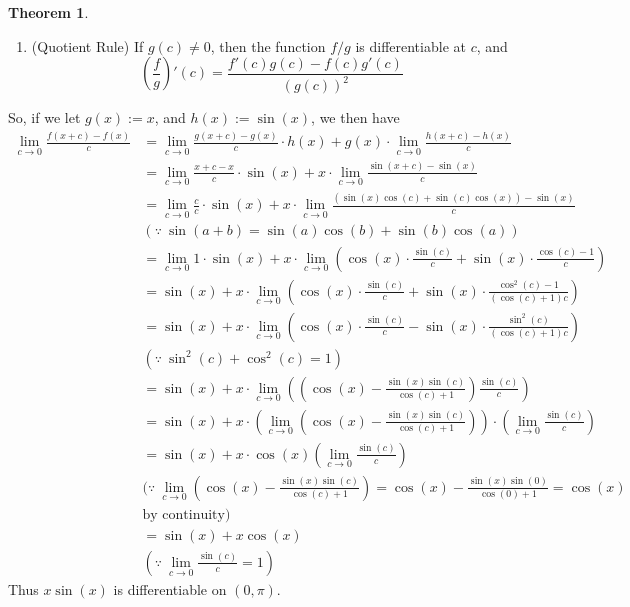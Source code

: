 \documentclass[12pt,letterpaper]{article}
\theoremstyle{case}
\theoremstyle{definition}
\newtheorem*{theorem*}{Theorem}
\begin{document}
\begin{enumerate}
\begin{enumerate}
\begin{theorem*}
\begin{enumerate}
					\item (Quotient Rule) If $g(c) \neq 0$, then the function $f/g$ is differentiable at $c$, and
					\[\left( \frac{f}{g}\right)'(c) = \frac{f'(c)g(c)-f(c)g'(c)}{(g(c))^2}\]
				\end{enumerate}
			\end{theorem*}
			So, if we let $g(x):=x$, and $h(x):=\sin (x)$, we then have
			\begin{align*}
				\lim\limits_{c \to 0} \frac{f(x+c)-f(x)}{c} &= \lim\limits_{c \to 0} \frac{g(x+c)-g(x)}{c} \cdot h(x) + g(x) \cdot \lim\limits_{c \to 0} \frac{h(x+c)-h(x)}{c} \\
				&= \lim\limits_{c \to 0} \frac{x+c-x}{c} \cdot \sin (x) + x \cdot \lim\limits_{c \to 0} \frac{\sin (x+c)-\sin (x)}{c} \\
				&= \lim\limits_{c \to 0} \frac{c}{c} \cdot \sin(x) + x \cdot \lim\limits_{c \to 0} \frac{(\sin (x)\cos (c) + \sin(c)\cos(x))-\sin(x)}{c} \\
				& (\because\ \sin(a+b)=\sin(a)\cos(b)+\sin(b)\cos(a)) \\
				&= \lim\limits_{c \to 0} 1 \cdot \sin(x) + x \cdot\lim\limits_{c \to 0} \left(\cos(x)\cdot\frac{\sin(c)}{c}+\sin(x)\cdot\frac{\cos(c)-1}{c}\right) \\
				&=\sin(x)+x\cdot\lim\limits_{c \to 0} \left(\cos(x) \cdot \frac{\sin(c)}{c} + \sin(x) \cdot \frac{\cos^2(c)-1}{(\cos(c)+1)c}\right) \\
				&=\sin(x)+x\cdot\lim\limits_{c \to 0} \left(\cos(x)\cdot\frac{\sin(c)}{c}-\sin(x)\cdot\frac{\sin^2(c)}{(\cos(c)+1)c}\right) \\
				&(\because\ \sin^2(c)+\cos^2(c)=1) \\
				&= \sin(x)+x\cdot\lim\limits_{c \to 0} \left(\left(\cos(x)-\frac{\sin(x)\sin(c)}{\cos(c)+1}\right)\frac{\sin(c)}{c}\right) \\
				&= \sin(x)+x\cdot\left(\lim\limits_{c \to 0} \left(\cos(x)-\frac{\sin(x)\sin(c)}{\cos(c)+1}\right)\right)\cdot\left(\lim\limits_{c \to 0} \frac{\sin(c)}{c} \right) \\
				&=\sin(x)+ x\cdot\cos(x)\left(\lim\limits_{c \to 0} \frac{\sin(c)}{c}\right) \\
				&(\because\ \lim\limits_{c \to 0} \left(\cos(x)-\frac{\sin(x)\sin(c)}{\cos(c)+1}\right)=\cos(x)-\frac{\sin(x)\sin(0)}{\cos(0)+1}=\cos(x) \\
				&\text{by continuity} )\\
				&= \sin(x)+x\cos(x) \\
				&(\because\ \lim\limits_{c \to 0} \frac{\sin(c)}{c}=1)
			\end{align*}
			Thus $x\sin(x)$ is differentiable on $(0,\pi)$.\\
			

\end{enumerate}
\end{enumerate}
\end{document}
